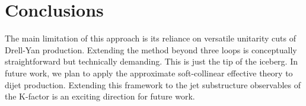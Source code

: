 \section{Conclusions}\label{sec:conclusions}

The main limitation of this approach is its reliance on versatile
unitarity cuts of Drell-Yan production. Extending the method beyond
three loops is conceptually straightforward but technically demanding.
This is just the tip of the iceberg. In future work, we plan to apply
the approximate soft-collinear effective theory to dijet production.
Extending this framework to the jet substructure observables of the
K-factor is an exciting direction for future work.


